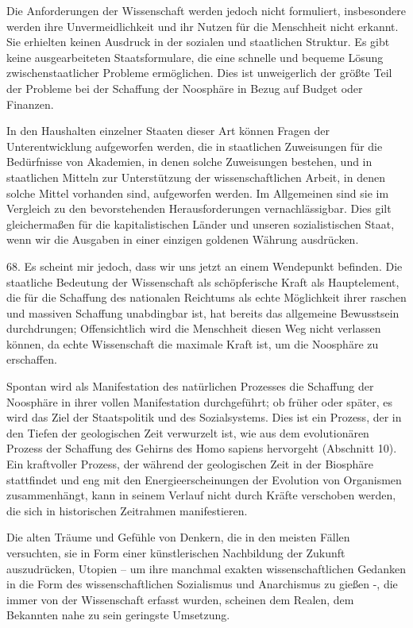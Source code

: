 \documentclass[11pt,a4paper]{book}
\begin{document}
Die Anforderungen der Wissenschaft werden jedoch nicht formuliert, insbesondere werden ihre Unvermeidlichkeit und ihr Nutzen für die Menschheit nicht erkannt. Sie erhielten keinen Ausdruck in der sozialen und staatlichen Struktur. Es gibt keine ausgearbeiteten Staatsformulare, die eine schnelle und bequeme Lösung zwischenstaatlicher Probleme ermöglichen. Dies ist unweigerlich der größte Teil der Probleme bei der Schaffung der Noosphäre in Bezug auf Budget oder Finanzen.



In den Haushalten einzelner Staaten dieser Art können Fragen der Unterentwicklung aufgeworfen werden, die in staatlichen Zuweisungen für die Bedürfnisse von Akademien, in denen solche Zuweisungen bestehen, und in staatlichen Mitteln zur Unterstützung der wissenschaftlichen Arbeit, in denen solche Mittel vorhanden sind, aufgeworfen werden. Im Allgemeinen sind sie im Vergleich zu den bevorstehenden Herausforderungen vernachlässigbar. Dies gilt gleichermaßen für die kapitalistischen Länder und unseren sozialistischen Staat, wenn wir die Ausgaben in einer einzigen goldenen Währung ausdrücken.



68. Es scheint mir jedoch, dass wir uns jetzt an einem Wendepunkt befinden. Die staatliche Bedeutung der Wissenschaft als schöpferische Kraft als Hauptelement, die für die Schaffung des nationalen Reichtums als echte Möglichkeit ihrer raschen und massiven Schaffung unabdingbar ist, hat bereits das allgemeine Bewusstsein durchdrungen; Offensichtlich wird die Menschheit diesen Weg nicht verlassen können, da echte Wissenschaft die maximale Kraft ist, um die Noosphäre zu erschaffen.



Spontan wird als Manifestation des natürlichen Prozesses die Schaffung der Noosphäre in ihrer vollen Manifestation durchgeführt; ob früher oder später, es wird das Ziel der Staatspolitik und des Sozialsystems. Dies ist ein Prozess, der in den Tiefen der geologischen Zeit verwurzelt ist, wie aus dem evolutionären Prozess der Schaffung des Gehirns des Homo sapiens hervorgeht (Abschnitt 10). Ein kraftvoller Prozess, der während der geologischen Zeit in der Biosphäre stattfindet und eng mit den Energieerscheinungen der Evolution von Organismen zusammenhängt, kann in seinem Verlauf nicht durch Kräfte verschoben werden, die sich in historischen Zeitrahmen manifestieren.



Die alten Träume und Gefühle von Denkern, die in den meisten Fällen versuchten, sie in Form einer künstlerischen Nachbildung der Zukunft auszudrücken, Utopien -- um ihre manchmal exakten wissenschaftlichen Gedanken in die Form des wissenschaftlichen Sozialismus und Anarchismus zu gießen -, die immer von der Wissenschaft erfasst wurden, scheinen dem Realen, dem Bekannten nahe zu sein geringste Umsetzung.
\end{document}
